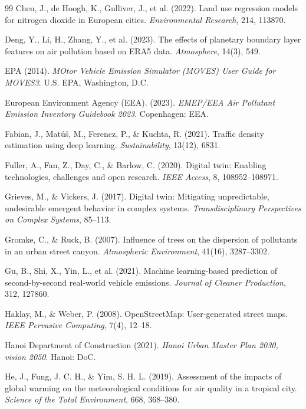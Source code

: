 \documentclass[12pt,a4paper]{article}
\begin{document}
\begin{thebibliography}{99}
Chen, J., de Hoogh, K., Gulliver, J., et al. (2022). Land use regression models for nitrogen dioxide in European cities. \textit{Environmental Research}, 214, 113870.

Deng, Y., Li, H., Zhang, Y., et al. (2023). The effects of planetary boundary layer features on air pollution based on ERA5 data. \textit{Atmosphere}, 14(3), 549.

EPA (2014). \textit{MOtor Vehicle Emission Simulator (MOVES) User Guide for MOVES3}. U.S. EPA, Washington, D.C.

European Environment Agency (EEA). (2023). \textit{EMEP/EEA Air Pollutant Emission Inventory Guidebook 2023}. Copenhagen: EEA.

Fabian, J., Matúš, M., Ferencz, P., \& Kuchta, R. (2021). Traffic density estimation using deep learning. \textit{Sustainability}, 13(12), 6831.

Fuller, A., Fan, Z., Day, C., \& Barlow, C. (2020). Digital twin: Enabling technologies, challenges and open research. \textit{IEEE Access}, 8, 108952--108971.

Grieves, M., \& Vickers, J. (2017). Digital twin: Mitigating unpredictable, undesirable emergent behavior in complex systems. \textit{Transdisciplinary Perspectives on Complex Systems}, 85--113.

Gromke, C., \& Ruck, B. (2007). Influence of trees on the dispersion of pollutants in an urban street canyon. \textit{Atmospheric Environment}, 41(16), 3287--3302.

Gu, B., Shi, X., Yin, L., et al. (2021). Machine learning-based prediction of second-by-second real-world vehicle emissions. \textit{Journal of Cleaner Production}, 312, 127860.

Haklay, M., \& Weber, P. (2008). OpenStreetMap: User-generated street maps. \textit{IEEE Pervasive Computing}, 7(4), 12--18.

Hanoi Department of Construction (2021). \textit{Hanoi Urban Master Plan 2030, vision 2050}. Hanoi: DoC.

He, J., Fung, J. C. H., \& Yim, S. H. L. (2019). Assessment of the impacts of global warming on the meteorological conditions for air quality in a tropical city. \textit{Science of the Total Environment}, 668, 368--380.


\end{thebibliography}
\end{document}
